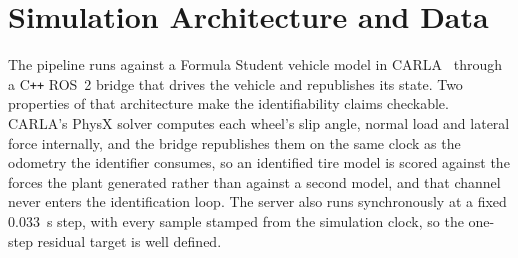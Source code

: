 \section{Simulation Architecture and Data}
\label{sec:platform}

The pipeline runs against a Formula Student vehicle model in
CARLA~\cite{carla2017} through a C\texttt{++} ROS~2 bridge that drives the
vehicle and republishes its state. Two properties of that architecture make
the identifiability claims checkable. CARLA's PhysX solver computes each
wheel's slip angle, normal load and lateral force internally, and the bridge
republishes them on the same clock as the odometry the identifier consumes, so
an identified tire model is scored against the forces the plant generated
rather than against a second model, and that channel never enters the
identification loop. The server also runs synchronously at a fixed
\SI{0.033}{\second} step, with every sample stamped from the simulation clock,
so the one-step residual target is well defined.


